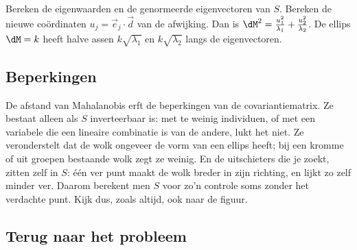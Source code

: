 \begin{werkwijze}
Bereken de eigenwaarden en de genormeerde eigenvectoren van $S$. Bereken de nieuwe coördinaten $u_j = \vec e_j \cdot \vec d$ van de afwijking. Dan is $\dM^2 = \frac{u_1^2}{\lambda_1} + \frac{u_2^2}{\lambda_2}$. De ellips $\dM = k$ heeft halve assen $k\sqrt{\lambda_1}$ en $k\sqrt{\lambda_2}$ langs de eigenvectoren.
\end{werkwijze}

\begin{oefeningen}
\end{oefeningen}

\subsection{Beperkingen}

De afstand van Mahalanobis erft de beperkingen van de covariantiematrix. Ze bestaat alleen als $S$ inverteerbaar is: met te weinig individuen, of met een variabele die een lineaire combinatie is van de andere, lukt het niet. Ze veronderstelt dat de wolk ongeveer de vorm van een ellips heeft; bij een kromme of uit groepen bestaande wolk zegt ze weinig. En de uitschieters die je zoekt, zitten zelf in $S$: één ver punt maakt de wolk breder in zijn richting, en lijkt zo zelf minder ver. Daarom berekent men $S$ voor zo'n controle soms zonder het verdachte punt. Kijk dus, zoals altijd, ook naar de figuur.

\begin{oefeningen}
\end{oefeningen}

\subsection{Terug naar het probleem}


